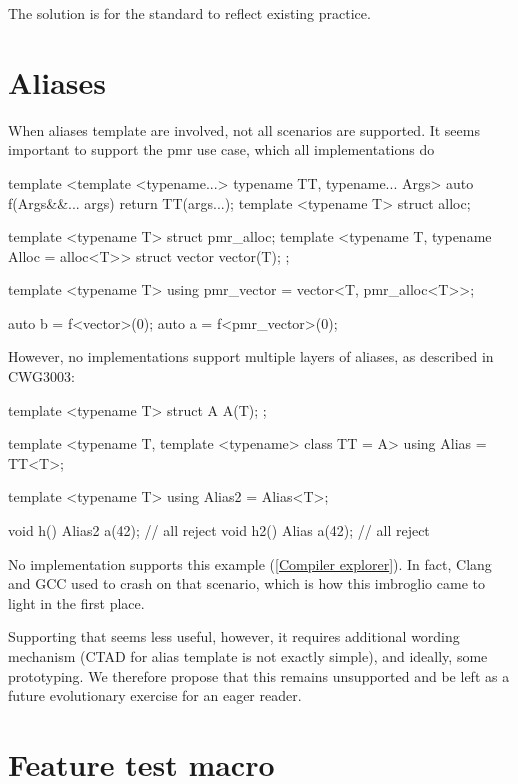 \documentclass{wg21}
\begin{document}
The solution is for the standard to reflect existing practice.

\section{Aliases}

When aliases template are involved, not all scenarios are supported.
It seems important to support the pmr use case, which all implementations do

\begin{colorblock}
template <template <typename...> typename TT, typename... Args>
auto f(Args&&... args) {
    return TT(args...);
}
template <typename T>
struct alloc;

template <typename T>
struct pmr_alloc;
\textbf{}
template <typename T, typename Alloc = alloc<T>>
struct vector {
    vector(T);
};

template <typename T>
using pmr_vector = vector<T, pmr_alloc<T>>;

auto b = f<vector>(0);
auto a = f<pmr_vector>(0);
\end{colorblock}

However, no implementations support multiple layers of aliases, as described in CWG3003:

\begin{colorblock}
template <typename T> struct A { A(T); };

template <typename T, template <typename> class TT = A>
using Alias = TT<T>;

template <typename T>
using Alias2 = Alias<T>;

void h() { Alias2 a(42); } // all reject
void h2() { Alias a(42); } // all reject
\end{colorblock}


No implementation supports this example ([\href{https://godbolt.org/z/s9jsPTnhG}{Compiler explorer}]).
In fact, Clang and GCC used to crash on that scenario, which is how this imbroglio came to light in the first place.

Supporting that seems less useful, however, it requires additional wording mechanism (CTAD for alias template is not exactly simple), and ideally, some prototyping. We therefore propose that this remains unsupported and be left as a future evolutionary exercise for an eager reader.

\section{Feature test macro}
\end{document}
